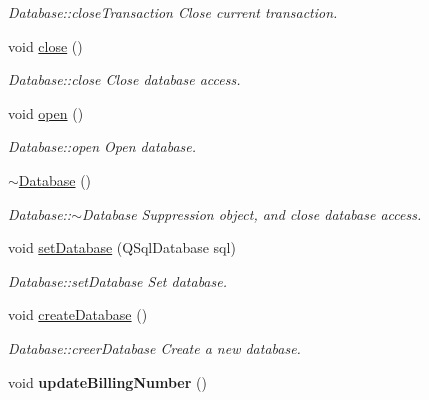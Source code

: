 \begin{DoxyCompactItemize}
\begin{DoxyCompactList}\small\item\em Database\+::close\+Transaction Close current transaction. \end{DoxyCompactList}\item 
\hypertarget{classDatabase_1_1Database_af4d88f98b0ce31369af5bbf4fd167664}{void \hyperlink{classDatabase_1_1Database_af4d88f98b0ce31369af5bbf4fd167664}{close} ()}\label{classDatabase_1_1Database_af4d88f98b0ce31369af5bbf4fd167664}

\begin{DoxyCompactList}\small\item\em Database\+::close Close database access. \end{DoxyCompactList}\item 
\hypertarget{classDatabase_1_1Database_aa12f5d991eb4d61ef0c6a0bc653f2580}{void \hyperlink{classDatabase_1_1Database_aa12f5d991eb4d61ef0c6a0bc653f2580}{open} ()}\label{classDatabase_1_1Database_aa12f5d991eb4d61ef0c6a0bc653f2580}

\begin{DoxyCompactList}\small\item\em Database\+::open Open database. \end{DoxyCompactList}\item 
\hypertarget{classDatabase_1_1Database_a52d0d890cef301f3dfb61121cf2c375b}{\hyperlink{classDatabase_1_1Database_a52d0d890cef301f3dfb61121cf2c375b}{$\sim$\+Database} ()}\label{classDatabase_1_1Database_a52d0d890cef301f3dfb61121cf2c375b}

\begin{DoxyCompactList}\small\item\em Database\+::$\sim$\+Database Suppression object, and close database access. \end{DoxyCompactList}\item 
void \hyperlink{classDatabase_1_1Database_acf027fd52b0669b1248cbb75e621c36a}{set\+Database} (Q\+Sql\+Database sql)
\begin{DoxyCompactList}\small\item\em Database\+::set\+Database Set database. \end{DoxyCompactList}\item 
\hypertarget{classDatabase_1_1Database_a4edb5ae1db1def878a728ce284d07871}{void \hyperlink{classDatabase_1_1Database_a4edb5ae1db1def878a728ce284d07871}{create\+Database} ()}\label{classDatabase_1_1Database_a4edb5ae1db1def878a728ce284d07871}

\begin{DoxyCompactList}\small\item\em Database\+::creer\+Database Create a new database. \end{DoxyCompactList}\item 
\hypertarget{classDatabase_1_1Database_ac0ea3c8fe13b47917a499ffa9ace1f1b}{void {\bfseries update\+Billing\+Number} ()}\label{classDatabase_1_1Database_ac0ea3c8fe13b47917a499ffa9ace1f1b}

\end{DoxyCompactItemize}
